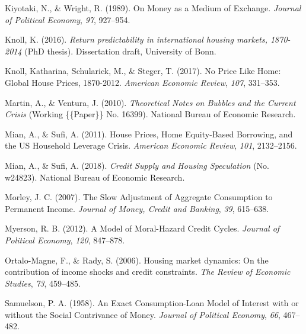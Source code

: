 \documentclass[
  12pt,
]{article}
\newlength{\cslhangindent}
\newlength{\cslentryspacingunit} %
\newenvironment{CSLReferences}[2] %
 {%
  \setlength{\parindent}{0pt}
  \ifodd #1
  \let\oldpar\par
  \def\par{\hangindent=\cslhangindent\oldpar}
  \fi
  \setlength{\parskip}{#2\cslentryspacingunit}
 }%
 {}
\begin{document}
\begin{CSLReferences}{1}{0}
\leavevmode{}%
Kiyotaki, N., \& Wright, R. (1989). On {Money} as a {Medium} of {Exchange}. \emph{Journal of Political Economy}, \emph{97}, 927--954.

\leavevmode{}%
Knoll, K. (2016). \emph{Return predictability in international housing markets, 1870-2014} (PhD thesis). Dissertation draft, University of Bonn.

\leavevmode{}%
Knoll, Katharina, Schularick, M., \& Steger, T. (2017). No {Price Like Home}: {Global House Prices}, 1870-2012. \emph{American Economic Review}, \emph{107}, 331--353.

\leavevmode{}%
Martin, A., \& Ventura, J. (2010). \emph{Theoretical {Notes} on {Bubbles} and the {Current Crisis}} (Working \{\{Paper\}\} No. 16399). {National Bureau of Economic Research}.

\leavevmode{}%
Mian, A., \& Sufi, A. (2011). House {Prices}, {Home Equity}-{Based Borrowing}, and the {US Household Leverage Crisis}. \emph{American Economic Review}, \emph{101}, 2132--2156.

\leavevmode{}%
Mian, A., \& Sufi, A. (2018). \emph{Credit {Supply} and {Housing Speculation}} (No. w24823). {National Bureau of Economic Research}.

\leavevmode{}%
Morley, J. C. (2007). The {Slow Adjustment} of {Aggregate Consumption} to {Permanent Income}. \emph{Journal of Money, Credit and Banking}, \emph{39}, 615--638.

\leavevmode{}%
Myerson, R. B. (2012). A {Model} of {Moral}-{Hazard Credit Cycles}. \emph{Journal of Political Economy}, \emph{120}, 847--878.

\leavevmode{}%
Ortalo-Magne, F., \& Rady, S. (2006). Housing market dynamics: {On} the contribution of income shocks and credit constraints. \emph{The Review of Economic Studies}, \emph{73}, 459--485.

\leavevmode{}%
Samuelson, P. A. (1958). An {Exact Consumption}-{Loan Model} of {Interest} with or without the {Social Contrivance} of {Money}. \emph{Journal of Political Economy}, \emph{66}, 467--482.


\end{CSLReferences}
\end{document}
